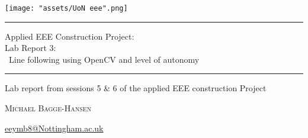 \begin{titlepage} %

	\centering %
	
	\scshape %
	
	
	\texttt{[image: "assets/UoN eee".png]}
	
	 
	\rule{\textwidth}{2pt}\vspace*{-\baselineskip}\vspace*{2pt} %
	
	\vspace{0.75\baselineskip} %
	
	{\LARGE Applied EEE Construction Project:\\ Lab Report 3: \\ \ Line following using OpenCV and level of autonomy\\} %
	
	\vspace{0.75\baselineskip} %
	
	\rule{\textwidth}{2pt} %
	
	\vspace{2\baselineskip} %
	
	
	Lab report from sessions 5 \& 6 of the applied EEE construction Project %
	
	\vspace*{3\baselineskip} %
	
	

	
	\vspace{0.5\baselineskip} %
	
	{\scshape\Large Michael Bagge-Hansen } %

	\href{mailto:eeymb8@Nottingham.ac.uk}{eeymb8@Nottingham.ac.uk}
	
	\vspace{1\baselineskip}
	

\end{titlepage}
